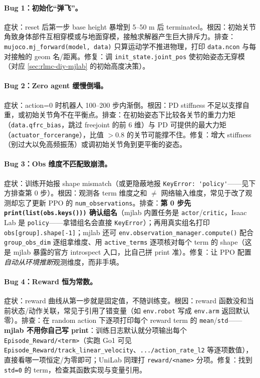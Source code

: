 \paragraph{Bug 1：初始化“弹飞”。}症状：reset 后第一步 base height 暴增到 5--50 m 后 terminated。根因：初始关节角致身体部件互相穿模或与地面穿模，接触求解器产生巨大排斥力。排查：\verb|mujoco.mj_forward(model, data)| 只算运动学不推进物理，打印 \verb|data.ncon| 与每对接触的 geom 名/距离。修复：调 \verb|init_state.joint_pos| 使初始姿态无穿模（对应 \cref{sec:rlmc-diy-mjlab} 的初始高度决策）。

\paragraph{Bug 2：Zero agent 缓慢倒塌。}症状：action=0 时机器人 100--200 步内渐倒。根因：PD stiffness 不足以支撑自重，或初始关节角不在平衡点。排查：在初始姿态下比较各关节的重力力矩（\verb|data.qfrc_bias|，跳过 freejoint 的前 6 维）与 PD 可提供的最大力矩（\verb|actuator_forcerange|），比值 $>0.8$ 的关节可能撑不住。修复：增大 stiffness（别过大以免高频振荡）或调初始关节角到更平衡的姿态。

\paragraph{Bug 3：Obs 维度不匹配致崩溃。}症状：训练开始报 shape mismatch（或更隐蔽地报 \verb|KeyError: 'policy'|——见下方排查第 0 步）。根因：观测各 term 维度之和 $\ne$ 网络输入维度，常见于改了观测却忘了更新 PPO 的 \verb|num_observations|。排查：\textbf{第 0 步先 \texttt{print(list(obs.keys()))} 确认组名}（mjlab 内置任务是 \verb|actor|/\verb|critic|，Isaac Lab 是 \verb|policy|——拿错组名会直接 \verb|KeyError|）；再用真实组名打印 \verb|obs[group].shape[-1]|；mjlab 还可 \verb|env.observation_manager.compute()| 配合 \verb|group_obs_dim| 逐组拿维度、用 \verb|active_terms| 逐项核对每个 term 的 shape（这是 mjlab 暴露的官方 introspect 入口，比自己拼 print 准）。修复：让 PPO 配置\emph{自动从环境推断}观测维度，而非手填。

\paragraph{Bug 4：Reward 恒为常数。}症状：reward 曲线从第一步就是固定值，不随训练变。根因：reward 函数没和当前状态/动作关联，常见于引用了错变量（如 \verb|env.robot| 写成 \verb|env.arm| 返回默认零）。排查：在 random action 下逐项打印每个 reward term 的 \verb|mean|/\verb|std|——\textbf{mjlab 不用你自己写 print}：训练日志默认就分项输出每个 \verb|Episode_Reward/<term>|（实跑 Go1 可见 \verb|Episode_Reward/track_linear_velocity|、\verb|.../action_rate_l2| 等逐项数值），直接看哪一项恒定/为零即可；UniLab 同理打 \verb|reward/<name>| 分项。修复：找到 \verb|std=0| 的 term，检查其函数实现与变量引用。

